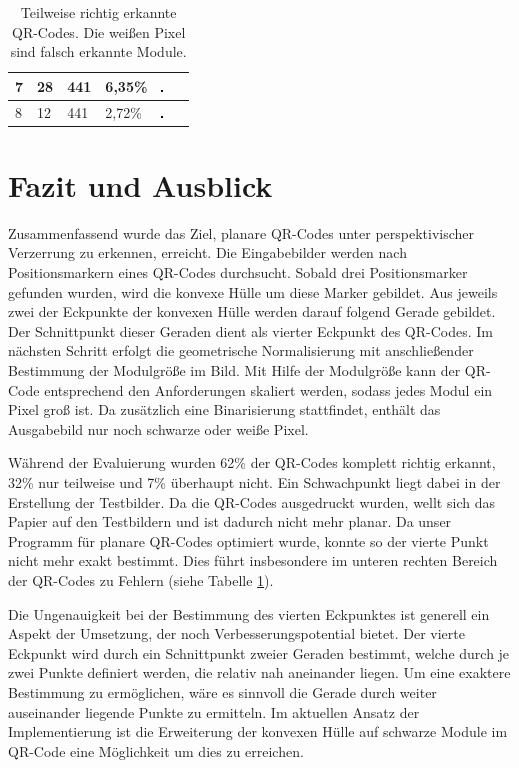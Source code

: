 \documentclass[a4paper, oneside, 12pt]{article}
\begin{document}
\begin{table}[h]
\begin{tabular}{ | p{} | p{} | p{} | p{} | p{} |}
	\hline
	7 & 28 & 441 & 6,35\% & \includegraphics[width=0.1\textwidth]{images/test1_2.png}\\	
	\hline
	8 & 12 & 441 & 2,72\% & \includegraphics[width=0.1\textwidth]{images/test2_2.png}\\	
	\hline
\end{tabular}
\caption{Teilweise richtig erkannte QR-Codes. Die weißen Pixel sind falsch erkannte Module.}
\label{tab:teilweiseKorrekt}
\end{table}

\newpage
\section{Fazit und Ausblick}
Zusammenfassend wurde das Ziel, planare QR-Codes unter perspektivischer Verzerrung zu erkennen, erreicht. Die Eingabebilder werden nach Positionsmarkern eines QR-Codes durchsucht. Sobald drei Positionsmarker gefunden wurden, wird die konvexe Hülle um diese Marker gebildet. Aus jeweils zwei der Eckpunkte der konvexen Hülle werden darauf folgend Gerade gebildet. Der Schnittpunkt dieser Geraden dient als vierter Eckpunkt des QR-Codes. Im nächsten Schritt erfolgt die geometrische Normalisierung mit anschließender Bestimmung der Modulgröße im Bild. Mit Hilfe der Modulgröße kann der QR-Code entsprechend den Anforderungen skaliert werden, sodass jedes Modul ein Pixel groß ist. Da zusätzlich eine Binarisierung stattfindet, enthält das Ausgabebild nur noch schwarze oder weiße Pixel. 

Während der Evaluierung wurden 62\% der QR-Codes komplett richtig erkannt, 32\% nur teilweise und 7\% überhaupt nicht. Ein Schwachpunkt liegt dabei in der Erstellung der Testbilder. Da die QR-Codes ausgedruckt wurden, wellt sich das Papier auf den Testbildern und ist dadurch nicht mehr planar. Da unser Programm für planare QR-Codes optimiert wurde, konnte so der vierte Punkt nicht mehr exakt bestimmt. Dies führt insbesondere im unteren rechten Bereich der QR-Codes zu Fehlern (siehe Tabelle \ref{tab:teilweiseKorrekt}). 

Die Ungenauigkeit bei der Bestimmung des vierten Eckpunktes ist generell ein Aspekt der Umsetzung, der noch Verbesserungspotential bietet. Der vierte Eckpunkt wird durch ein Schnittpunkt zweier Geraden bestimmt, welche durch je zwei Punkte definiert werden, die relativ nah aneinander liegen. Um eine exaktere Bestimmung zu ermöglichen, wäre es sinnvoll die Gerade durch weiter auseinander liegende Punkte zu ermitteln. Im aktuellen Ansatz der Implementierung ist die Erweiterung der konvexen Hülle auf schwarze Module im QR-Code eine Möglichkeit um dies zu erreichen.
\end{document}
